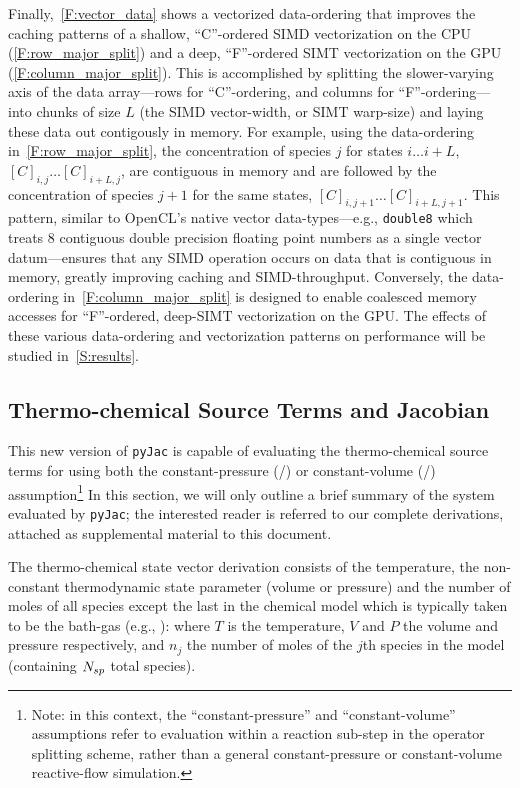 \documentclass[12pt,number,sort&compress,preprint]{elsarticle}
\begin{document}
Finally,~\cref{F:vector_data} shows a vectorized data-ordering that improves the caching patterns of a shallow, ``C''-ordered SIMD vectorization on the CPU (\cref{F:row_major_split}) and a deep, ``F''-ordered SIMT vectorization on the GPU (\cref{F:column_major_split}).
This is accomplished by splitting the slower-varying axis of the data array---rows for ``C''-ordering, and columns for ``F''-ordering---into chunks of size $L$ (the SIMD vector-width, or SIMT warp-size) and laying these data out contigously in memory.
For example, using the data-ordering in~\cref{F:row_major_split}, the concentration of species $j$ for states $i\ldots i+L$, $[C]_{i, j} \ldots [C]_{i + L, j}$, are contiguous in memory and are followed by the concentration of species $j + 1$ for the same states, $[C]_{i, j + 1} \ldots [C]_{i + L, j + 1}$.
This pattern, similar to OpenCL's native vector data-types---e.g., \texttt{double\num{8}} which treats \num{8} contiguous double precision floating point numbers as a single vector datum---ensures that any SIMD operation occurs on data that is contiguous in memory, greatly improving caching and SIMD-throughput.
Conversely, the data-ordering in~\cref{F:column_major_split} is designed to enable coalesced memory accesses for ``F''-ordered, deep-SIMT vectorization on the GPU.
The effects of these various data-ordering and vectorization patterns on performance will be studied in~\cref{S:results}.

\subsection{Thermo-chemical Source Terms and Jacobian}
This new version of \texttt{pyJac} is capable of evaluating the thermo-chemical source terms for using both the constant-pressure (\conp/) or constant-volume (\conv/) assumption\footnote{Note: in this context, the ``constant-pressure'' and ``constant-volume'' assumptions refer to evaluation within a reaction sub-step in the operator splitting scheme, rather than a general constant-pressure or constant-volume reactive-flow simulation.}
In this section, we will only outline a brief summary of the system evaluated by \texttt{pyJac}; the interested reader is referred to our complete derivations, attached as supplemental material to this document.


The thermo-chemical state vector derivation consists of the temperature, the non-constant thermodynamic state parameter (volume or pressure) and the number of moles of all species except the last in the chemical model which is typically taken to be the bath-gas (e.g., ):
where $T$ is the temperature, $V$ and $P$ the volume and pressure respectively, and $n_j$ the number of moles of the $j$th species in the model (containing $\ns/$ total species).
\end{document}
